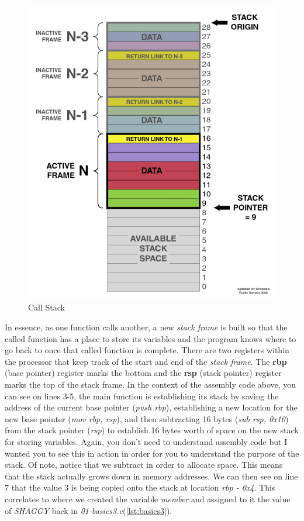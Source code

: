 \documentclass[../main.tex]{subfiles}
\begin{document}
	\begin{figure}[h]
		\centering\includegraphics[scale=0.3]{callstack3.png}
		\caption{Call Stack}
		\label{fig:callstack}
	\end{figure}

	In essence, as one function calls another, a new \textit{stack frame} is built so that the called function has a place to store its variables and the program knows where to go back to once that called function is complete.  There are two registers within the processor that keep track of the start and end of the \textit{stack frame}.  The \textbf{rbp} (base pointer)  register marks the bottom and the \textbf{rsp} (stack pointer) register marks the top of the stack frame.  In the context of the assembly code above, you can see on lines 3-5, the main function is establishing its stack by saving the address of the current base pointer (\textit{push rbp}), establishing a new location for the new base pointer (\textit{mov rbp, rsp}), and then subtracting 16 bytes (\textit{sub rsp, 0x10}) from the stack pointer (\textit{rsp}) to establish 16 bytes worth of space on the new stack for storing variables.  Again, you don't need to understand assembly code but I wanted you to see this in action in order for you to understand the purpose of the stack.  Of note, notice that we subtract in order to allocate space.  This means that the stack actually grows down in memory addresses.  We can then see on line 7 that the value 3 is being copied onto the stack at location \textit{rbp - 0x4}.  This correlates to where we created the variable \textit{member} and assigned to it the value of \textit{SHAGGY} back in \textit{01-basics3.c}(\ref{lst:basics3}).
	
\end{document}
